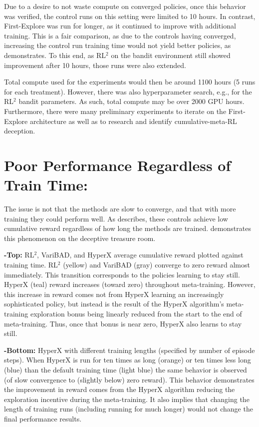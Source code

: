 \documentclass{article}
\begin{document}
Due to a desire to not waste compute on converged policies, once this behavior was verified, the control runs on this setting were limited to 10 hours. In contrast, First-Explore was run for longer, as it continued to improve with additional training. This is a fair comparison, as due to the controls having converged, increasing the control run training time would not yield better policies, as  demonstrates. To this end, as RL\(^2\) on the bandit environment still showed improvement after 10 hours, those runs were also extended.

Total compute used for the experiments would then be around 1100 hours (5 runs for each treatment). However, there was also hyperparameter search, e.g., for the RL\(^2\) bandit parameters. As such, total compute may be over 2000 GPU hours. Furthermore, there were many preliminary experiments to iterate on the First-Explore architecture as well as to research and identify cumulative-meta-RL deception.


\section{Poor Performance Regardless of Train Time:}
\label{sec:training-time-scale}
The issue is not that the methods are slow to converge, and that with more training they could perform well. As  describes, these controls achieve low cumulative reward regardless of how long the methods are trained.  demonstrates this phenomenon on the deceptive treasure room. 

\textbf{-Top:} RL\(^2\), VariBAD, and HyperX average cumulative reward plotted against training time. RL\(^2\) (yellow) and VariBAD (gray) converge to zero reward almost immediately. This transition corresponds to the policies learning to stay still. HyperX (teal) reward increases (toward zero) throughout meta-training. However, this increase in reward comes not from HyperX learning an increasingly sophisticated policy, but instead is the result of the HyperX algorithm’s meta-training exploration bonus being linearly reduced from the start to the end of meta-training. Thus, once that bonus is near zero, HyperX also learns to stay still. 

\textbf{-Bottom:} HyperX with different training lengths (specified by number of episode steps). When HyperX is run for ten times as long (orange) or ten times less long (blue) than the default training time (light blue) the same behavior is observed (of slow convergence to (slightly below) zero reward). This behavior demonstrates the improvement in reward comes from the HyperX algorithm reducing the exploration incentive during the meta-training. It also implies that changing the length of training runs (including running for much longer) would not change the final performance results.
\end{document}

